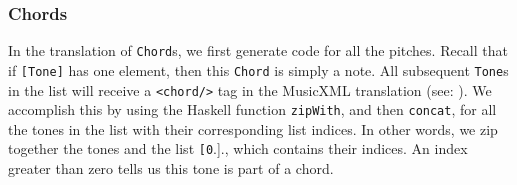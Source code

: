\documentclass{report}
\begin{document}
\subsubsection{Chords}

In the translation of \verb.Chord.s, we first generate code for all the pitches. Recall that if \verb.[Tone]. has one element, then this \verb.Chord. is simply a note. All subsequent \verb.Tone.s in the list will receive a \verb.<chord/>. tag in the MusicXML translation (see: ). We accomplish this by using the Haskell function \verb.zipWith., and then \verb.concat., for all the tones in the list with their corresponding list indices. In other words, we zip together the tones and the list \verb.[0..]., which contains their indices. An index greater than zero tells us this tone is part of a chord.
\end{document}
